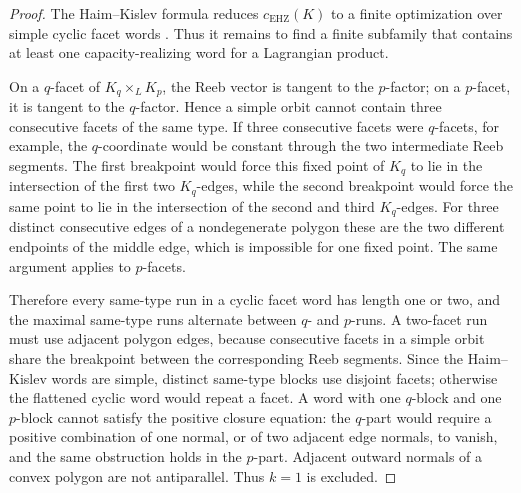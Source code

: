 \begin{proof}
The Haim--Kislev formula reduces \(c_{\mathrm{EHZ}}(K)\) to a finite
optimization over simple cyclic facet words \cite{HK2017}. Thus it remains to
find a finite subfamily that contains at least one capacity-realizing word for
a Lagrangian product.

On a \(q\)-facet of \(K_q\times_L K_p\), the Reeb vector is tangent to the
\(p\)-factor; on a \(p\)-facet, it is tangent to the \(q\)-factor. Hence a
simple orbit cannot contain three consecutive facets of the same type. If
three consecutive facets were \(q\)-facets, for example, the \(q\)-coordinate
would be constant through the two intermediate Reeb segments. The first
breakpoint would force this fixed point of \(K_q\) to lie in the intersection
of the first two \(K_q\)-edges, while the second breakpoint would force the
same point to lie in the intersection of the second and third \(K_q\)-edges.
For three distinct consecutive edges of a nondegenerate polygon these are the
two different endpoints of the middle edge, which is impossible for one fixed
point. The same argument applies to \(p\)-facets.

Therefore every same-type run in a cyclic facet word has length one or two,
and the maximal same-type runs alternate between \(q\)- and \(p\)-runs. A
two-facet run must use adjacent polygon edges, because consecutive facets in a
simple orbit share the breakpoint between the corresponding Reeb segments.
Since the Haim--Kislev words are simple, distinct same-type blocks use disjoint
facets; otherwise the flattened cyclic word would repeat a facet. A word with
one \(q\)-block and one \(p\)-block cannot satisfy the positive closure
equation: the \(q\)-part would require a positive combination of one normal, or
of two adjacent edge normals, to vanish, and the same obstruction holds in the
\(p\)-part. Adjacent outward normals of a convex polygon are not antiparallel.
Thus \(k=1\) is excluded.


\end{proof}
